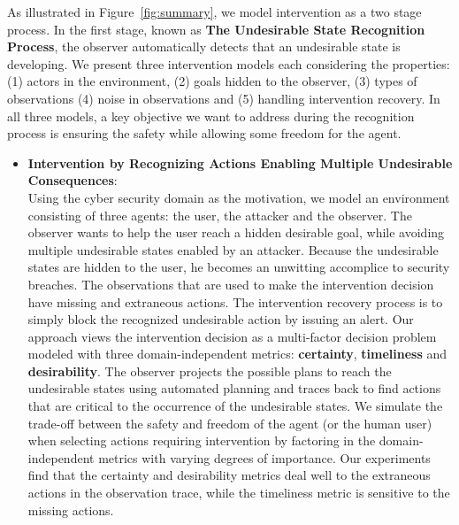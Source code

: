 As illustrated in Figure~\ref{fig:summary}, we model intervention as a two stage process.
In the first stage, known as \textbf{The Undesirable State Recognition Process}, the observer automatically detects that an undesirable state is developing.
We present three intervention models each considering the properties: (1) actors in the environment, (2) goals hidden to the observer, (3) types of observations (4) noise in observations and (5) handling intervention recovery.
In all three models, a key objective we want to address during the recognition process is ensuring the safety while allowing some freedom for the agent.
\begin{itemize}
\item \textbf{Intervention by Recognizing Actions Enabling Multiple Undesirable Consequences}: \\ Using the cyber security domain as the motivation, we model an environment consisting of three agents: the user, the attacker and the observer.
The observer wants to help the user reach a hidden desirable goal, while avoiding multiple undesirable states enabled by an attacker.
Because the undesirable states are hidden to the user, he becomes an unwitting accomplice to security breaches.
The observations that are used to make the intervention decision have missing and extraneous actions.
The intervention recovery process is to simply block the recognized undesirable action by issuing an alert.
Our approach views the intervention decision as a multi-factor decision problem modeled with three domain-independent metrics: \textbf{certainty}, \textbf{timeliness} and \textbf{desirability}.
The observer projects the possible plans to reach the undesirable states using automated planning and traces back to find actions that are critical to the occurrence of the undesirable states.
We simulate the trade-off between the safety and freedom of the agent (or the human user) when selecting actions requiring intervention by factoring in the domain-independent metrics with varying degrees of importance.
Our experiments find that the certainty and desirability  metrics deal well to the extraneous actions in the observation trace, while the timeliness metric is sensitive to the missing actions.


\end{itemize}
